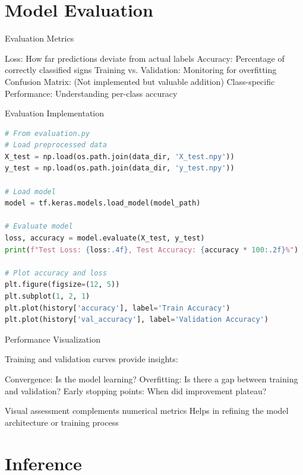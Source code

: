 \documentclass{beamer}
\begin{document}
\section{Model Evaluation}

\begin{frame}{Evaluation Metrics}
\begin{itemize}
{Loss}: How far predictions deviate from actual labels
{Accuracy}: Percentage of correctly classified signs
{Training vs. Validation}: Monitoring for overfitting
{Confusion Matrix}: (Not implemented but valuable addition)
{Class-specific Performance}: Understanding per-class accuracy
\end{itemize}
\end{frame}

\begin{frame}{Evaluation Implementation}
\begin{lstlisting}[language=Python]
# From evaluation.py
# Load preprocessed data
X_test = np.load(os.path.join(data_dir, 'X_test.npy'))
y_test = np.load(os.path.join(data_dir, 'y_test.npy'))

# Load model
model = tf.keras.models.load_model(model_path)

# Evaluate model
loss, accuracy = model.evaluate(X_test, y_test)
print(f"Test Loss: {loss:.4f}, Test Accuracy: {accuracy * 100:.2f}%")

# Plot accuracy and loss
plt.figure(figsize=(12, 5))
plt.subplot(1, 2, 1)
plt.plot(history['accuracy'], label='Train Accuracy')
plt.plot(history['val_accuracy'], label='Validation Accuracy')
\end{lstlisting}
\end{frame}

\begin{frame}{Performance Visualization}
\begin{itemize}
    Training and validation curves provide insights:
    \begin{itemize}
        Convergence: Is the model learning?
        Overfitting: Is there a gap between training and validation?
        Early stopping points: When did improvement plateau?
    \end{itemize}
    Visual assessment complements numerical metrics
    Helps in refining the model architecture or training process
\end{itemize}
\end{frame}

\section{Inference}
\end{document}
